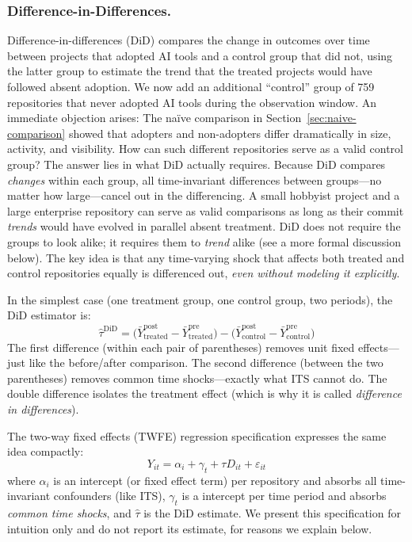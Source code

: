 \subsubsection{Difference-in-Differences.}
\label{sec:did}

Difference-in-differences (DiD) compares the change in outcomes over time between projects that adopted AI tools and a control group that did not, using the latter group to estimate the trend that the treated projects would have followed absent adoption.
We now add an additional ``control'' group of 759 repositories that never adopted AI tools during the observation window.
An immediate objection arises: The na\"ive comparison in Section~\ref{sec:naive-comparison} showed that adopters and non-adopters differ dramatically in size, activity, and visibility.
How can such different repositories serve as a valid control group?
The answer lies in what DiD actually requires.
Because DiD compares \emph{changes} within each group, all time-invariant differences between groups---no matter how large---cancel out in the differencing.
A small hobbyist project and a large enterprise repository can serve as valid comparisons as long as their commit \emph{trends} would have evolved in parallel absent treatment.
DiD does not require the groups to look alike; it requires them to \emph{trend} alike (see a more formal discussion below).
The key idea is that any time-varying shock that affects both treated and control repositories equally is differenced out, \emph{even without modeling it explicitly}.

In the simplest case (one treatment group, one control group, two periods), the DiD estimator is:
\begin{equation}
\label{eq:did-2x2}
\hat{\tau}^{\text{DiD}} = \bigl(\bar{Y}^{\text{post}}_{\text{treated}} - \bar{Y}^{\text{pre}}_{\text{treated}}\bigr) - \bigl(\bar{Y}^{\text{post}}_{\text{control}} - \bar{Y}^{\text{pre}}_{\text{control}}\bigr)
\end{equation}
The first difference (within each pair of parentheses) removes unit fixed effects---just like the before/after comparison.
The second difference (between the two parentheses) removes common time shocks---exactly what ITS cannot do.
The double difference isolates the treatment effect (which is why it is called \emph{difference in differences}).

The two-way fixed effects (TWFE) regression specification expresses the same idea compactly:
\begin{equation}
\label{eq:twfe}
Y_{it} = \alpha_i + \gamma_t + \tau D_{it} + \varepsilon_{it}
\end{equation}
where $\alpha_i$ is an intercept (or fixed effect term) per repository and absorbs all time-invariant confounders (like ITS), $\gamma_t$ is a intercept per time period and absorbs \emph{common time shocks}, and $\hat{\tau}$ is the DiD estimate.
We present this specification for intuition only and do not report its estimate, for reasons we explain below.

